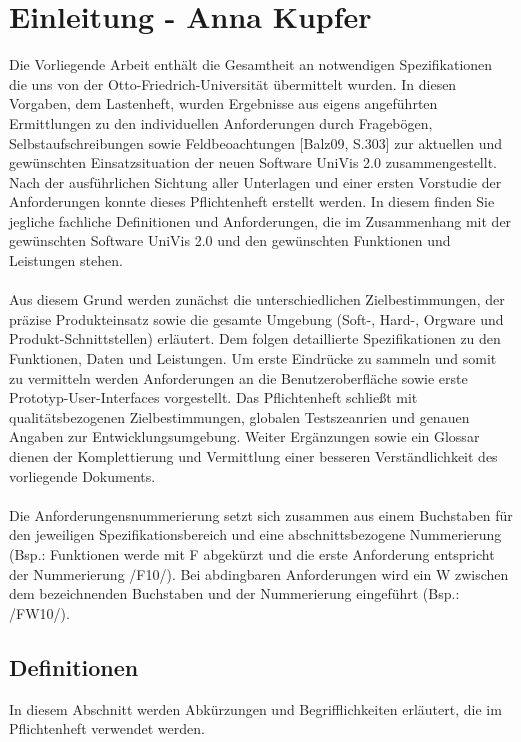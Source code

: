 \section{Einleitung - Anna Kupfer}
\label{sec:Einleitung}

Die Vorliegende Arbeit enthält die Gesamtheit an notwendigen Spezifikationen die uns von der Otto-Friedrich-Universität übermittelt wurden. 
In diesen Vorgaben, dem Lastenheft, wurden Ergebnisse aus eigens angeführten Ermittlungen zu den individuellen Anforderungen durch Fragebögen, Selbstaufschreibungen sowie Feldbeoachtungen [Balz09, S.303] zur aktuellen und gewünschten Einsatzsituation der neuen Software UniVis 2.0 zusammengestellt.
Nach der ausführlichen Sichtung aller Unterlagen und einer ersten Vorstudie der Anforderungen konnte dieses Pflichtenheft erstellt werden. In diesem finden Sie jegliche fachliche Definitionen und Anforderungen, die im Zusammenhang mit der gewünschten Software UniVis 2.0 und den gewünschten Funktionen und Leistungen stehen.
\\
\\
Aus diesem Grund werden zunächst die unterschiedlichen Zielbestimmungen, der präzise Produkteinsatz sowie die gesamte Umgebung (Soft-, Hard-, Orgware und Produkt-Schnittstellen) erläutert.
Dem folgen detaillierte Spezifikationen zu den Funktionen, Daten und Leistungen. Um erste Eindrücke zu sammeln und somit zu vermitteln werden Anforderungen an die Benutzeroberfläche sowie erste Prototyp-User-Interfaces vorgestellt. Das Pflichtenheft schließt mit qualitätsbezogenen Zielbestimmungen, globalen Testszeanrien und genauen Angaben zur Entwicklungsumgebung.
Weiter Ergänzungen sowie ein Glossar dienen der Komplettierung und Vermittlung einer besseren Verständlichkeit des vorliegende Dokuments.
\\
\\
Die Anforderungensnummerierung setzt sich zusammen aus einem Buchstaben für den jeweiligen Spezifikationsbereich und eine abschnittsbezogene Nummerierung (Bsp.: Funktionen werde mit F abgekürzt und die erste Anforderung entspricht der Nummerierung /F10/). Bei abdingbaren Anforderungen wird ein W zwischen dem bezeichnenden Buchstaben und der Nummerierung eingeführt (Bsp.: /FW10/).

\subsection{Definitionen}
\label{sec:Definitionen}

In diesem Abschnitt werden Abkürzungen und Begrifflichkeiten erläutert, die im Pflichtenheft verwendet werden. \\[0.25cm]

